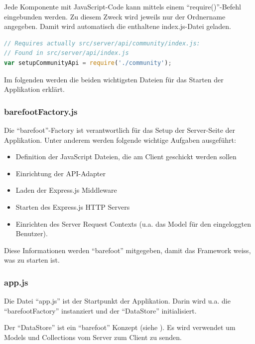 Jede Komponente mit JavaScript-Code kann mittels einem ``require()''-Befehl eingebunden werden. Zu diesem Zweck wird jeweils nur der Ordnername angegeben. Damit wird automatisch die enthaltene index.js-Datei geladen.


\begin{lstlisting}[language=JavaScript, caption=Einbindung der Community-Komponente, float=ht!]
// Requires actually src/server/api/community/index.js:
// Found in src/server/api/index.js
var setupCommunityApi = require('./community');
\end{lstlisting}

Im folgenden werden die beiden wichtigsten Dateien für das Starten der Applikation erklärt.

\subsubsection*{barefootFactory.js}
Die ``barefoot''-Factory \cite{barefootFactoryjs} ist verantwortlich für das Setup der Server-Seite der Applikation.
Unter anderem werden folgende wichtige Aufgaben ausgeführt:
\begin{itemize}
	\item{Definition der JavaScript Dateien, die am Client geschickt werden sollen}
	\item{Einrichtung der API-Adapter}
	\item{Laden der Express.js \cite{Expressjs} Middleware}
	\item{Starten des Express.js \cite{Expressjs} HTTP Servers}
	\item{Einrichten des Server Request Contexts (u.a. das Model für den eingeloggten Benutzer).}
\end{itemize}

Diese Informationen werden ``barefoot'' \cite{Barefoot} mitgegeben, damit das Framework weiss, was zu starten ist.

\subsubsection*{app.js}
Die Datei ``app.js'' \cite{appjs} ist der Startpunkt der Applikation.
Darin wird u.a. die ``barefootFactory'' instanziert und der ``DataStore'' initialisiert.

Der ``DataStore'' ist ein ``barefoot'' Konzept (siehe \cite{barefootDatastore}). Es wird verwendet um Models und Collections vom Server zum Client zu senden.